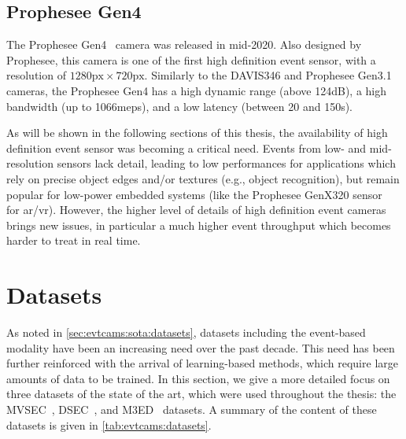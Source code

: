 \subsection{Prophesee Gen4}
The Prophesee Gen4~\cite{Finateu2020510A1} camera was released in mid-2020. Also designed by Prophesee, this camera is one of the first high definition event sensor, with a resolution of \(1280\text{px} \times 720\text{px}\). Similarly to the DAVIS346 and Prophesee Gen3.1 cameras, the Prophesee Gen4 has a high dynamic range (above 124dB), a high bandwidth (up to 1066\acrshort{meps}), and a low latency (between 20 and 150\textmu{}s).

As will be shown in the following sections of this thesis, the availability of high definition event sensor was becoming a critical need. Events from low- and mid-resolution sensors lack detail, leading to low performances for applications which rely on precise object edges and/or textures (e.g., object recognition), but remain popular for low-power embedded systems (like the Prophesee GenX320 sensor~\cite{Prophesee2023IntroducingTW} for \acrshort{ar}/\acrshort{vr}). However, the higher level of details of high definition event cameras brings new issues, in particular a much higher event throughput which becomes harder to treat in real time.

\section{Datasets}\label{sec:evtcams:datasets}
As noted in \cref{sec:evtcams:sota:datasets}, datasets including the event-based modality have been an increasing need over the past decade. This need has been further reinforced with the arrival of learning-based methods, which require large amounts of data to be trained. In this section, we give a more detailed focus on three datasets of the state of the art, which were used throughout the thesis: the MVSEC~\cite{Zhu2018TheMS}, DSEC~\cite{Gehrig2021DSECAS}, and M3ED~\cite{Chaney2023M3EDMM} datasets. A summary of the content of these datasets is given in \cref{tab:evtcams:datasets}.

